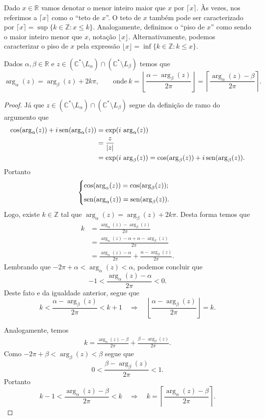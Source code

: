 Dado $x\in\mathbb{R}$ vamos denotar o menor inteiro maior que $x$
por $\lceil x\rceil$. Às vezes, nos referimos a $\lceil x\rceil$
como o ``teto de $x$''. O teto de $x$ também pode ser caracterizado por
$\lceil x\rceil = \sup\{k\in \mathbb{Z}: x\leq k \}$. Analogamente,
definimos o ``piso de $x$'' como sendo o maior inteiro menor que $x$,
notação $\lfloor x\rfloor$. 
Alternativamente, podemos caracterizar o piso de $x$ pela expressão 
$\lfloor x\rfloor = \inf\{k\in\mathbb{Z}: k\leq x\}$.


\begin{proposicao}\label{prop-arg_beta-arg_alpha}
Dados $\alpha,\beta\in\mathbb{R}$ e
$z\in (\mathbb{C}^{*}\setminus L_{\alpha})\cap(\mathbb{C}^{*}\setminus L_{\beta})$  
temos que 
\[
\arg_{\alpha}(z)=\arg_{\beta}(z)+2k\pi,\qquad  \text{onde}\ 
k = 
\left\lfloor \frac{\alpha-\arg_{\beta}(z)}{2\pi} \right\rfloor
=
\left\lceil \frac{\arg_{\alpha}(z)-\beta}{2\pi} \right\rceil. 
\]
\end{proposicao}

\begin{proof}
Já que 
$z\in (\mathbb{C}^{*}\setminus L_{\alpha})\cap(\mathbb{C}^{*}\setminus L_{\beta})$
segue da definição de ramo do argumento que
\begin{align*}
\cos(\arg_{\alpha}(z))+i \operatorname{sen}(\arg_{\alpha}(z))
&=
\exp(i\,\arg_{\alpha}(z))
\\ 
&= 
\frac{z}{|z|} 
\\
&= 
\exp(i\,\arg_{\beta}(z)) 
=
\cos(\arg_{\beta}(z))+i \operatorname{sen}(\arg_{\beta}(z)).
\end{align*}
Portanto 
\[
\begin{cases}
\cos(\arg_{\alpha}(z))=\cos(\arg_{\beta}(z));
\\[0.2cm]
\operatorname{sen}(\arg_{\alpha}(z))=\operatorname{sen}(\arg_{\beta}(z)).
\end{cases}
\]
Logo, existe $k\in\mathbb{Z}$ tal que 
$\arg_{\alpha}(z)= \arg_{\beta}(z)+2k\pi$.
Desta forma temos que
\begin{align*}
k
&=
\frac{\arg_{\alpha}(z)-\arg_{\beta}(z)}{2\pi}
\\
&=
\frac{\arg_{\alpha}(z)-\alpha+\alpha-\arg_{\beta}(z)}{2\pi}
\\
&=
\frac{\arg_{\alpha}(z)-\alpha}{2\pi}
+
\frac{\alpha-\arg_{\beta}(z)}{2\pi}.
\end{align*}
Lembrando que $-2\pi+\alpha<\arg_{\alpha}(z)<\alpha$,
podemos concluir que 
\[
-1<\frac{\arg_{\alpha}(z)-\alpha}{2\pi}<0.
\]
Deste fato e da igualdade anterior, segue que
\[
k< \frac{\alpha-\arg_{\beta}(z)}{2\pi}<k+1
\quad \Longrightarrow \quad 
\left\lfloor \frac{\alpha-\arg_{\beta}(z)}{2\pi} \right\rfloor = k.
\]

Analogamente, temos 
\begin{align*}
k
=
\frac{\arg_{\alpha}(z)-\beta}{2\pi}
+
\frac{\beta-\arg_{\beta}(z)}{2\pi}.
\end{align*}
Como $-2\pi+\beta<\arg_{\beta}(z)<\beta$ segue que 
\[
0<\frac{\beta-\arg_{\beta}(z)}{2\pi}<1.
\]
Portanto
\[
k-1<\frac{\arg_{\alpha}(z)-\beta}{2\pi}<k
\quad \Longrightarrow \quad
k= \left\lceil \frac{\arg_{\alpha}(z)-\beta}{2\pi} \right\rceil.
\]
\end{proof}



